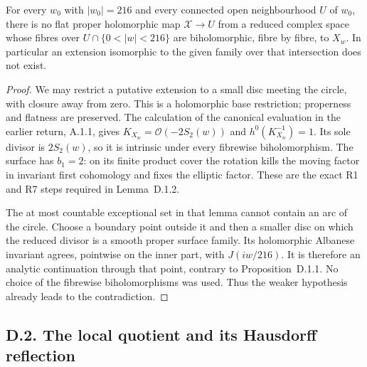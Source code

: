 \begin{theorem}
For every \(w_0\) with \(|w_0|=216\) and every connected open
neighbourhood \(U\) of \(w_0\), there is no flat proper holomorphic
map \(\mathcal X\to U\) from a reduced complex space whose fibres
over \(U\cap\{0<|w|<216\}\) are biholomorphic, fibre by fibre, to
\(X_w\). In particular an extension isomorphic to the given family
over that intersection does not exist.
\end{theorem}
\begin{proof}
We may restrict a putative extension to a small disc meeting the
circle, with closure away from zero. This is a holomorphic base
restriction; properness and flatness are preserved. The calculation
of the canonical evaluation in the earlier return, A.1.1, gives
\(K_{X_w}=\mathcal O(-2S_2(w))\) and
\(h^0(K_{X_w}^{-1})=1\). Its sole divisor is \(2S_2(w)\), so it is
intrinsic under every fibrewise biholomorphism. The surface has
\(b_1=2\): on its finite product cover the rotation kills the moving
factor in invariant first cohomology and fixes the elliptic factor.
These are the exact R1 and R7 steps required in Lemma~D.1.2.

The at most countable exceptional set in that lemma cannot contain
an arc of the circle. Choose a boundary point outside it and then a smaller disc
on which the reduced divisor is a smooth proper surface family. Its
holomorphic Albanese invariant agrees, pointwise on the inner part,
with \(J(iw/216)\). It is therefore an analytic continuation through
that point, contrary to Proposition~D.1.1. No choice of the
fibrewise biholomorphisms was used. Thus the weaker hypothesis already
leads to the contradiction.
\end{proof}

\subsection{D.2. The local quotient and its Hausdorff reflection}

